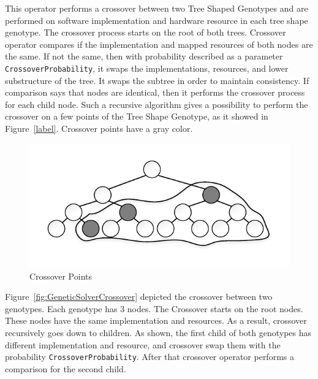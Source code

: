 This operator performs a crossover between two Tree Shaped Genotypes and are performed on software implementation and hardware resource in each tree shape genotype. 
The crossover process starts on the root of both trees. Crossover operator compares if the implementation and mapped resources of both nodes are the same. If not the same, then with probability described as a parameter \texttt{CrossoverProbability}, it swaps the implementations, resources, and lower substructure of the tree. It swaps the subtree in order to maintain consistency. If comparison says that nodes are identical, then it performs the crossover process for each child node. Such a recursive algorithm gives a possibility to perform the crossover on a few points of the Tree Shape Genotype, as it showed in Figure~\ref{label}. Crossover points have a gray color.

\begin{figure}
	\centering
	\includegraphics[width=\textwidth]{images/CrossoverPoints.pdf}
	\caption[Crossover Points]{Crossover Points}
	\label{fig:CrossoverPoints}
\end{figure}

Figure~\ref{fig:GeneticSolverCrossover} depicted the crossover between two genotypes. Each genotype has 3 nodes. The Crossover starts on the root nodes. These nodes have the same implementation and resources. As a result, crossover recursively goes down to children. As shown, the first child of both genotypes has different implementation and resource, and crossover swap them with the probability \texttt{CrossoverProbability}. After that crossover operator performs a comparison for the second child.


